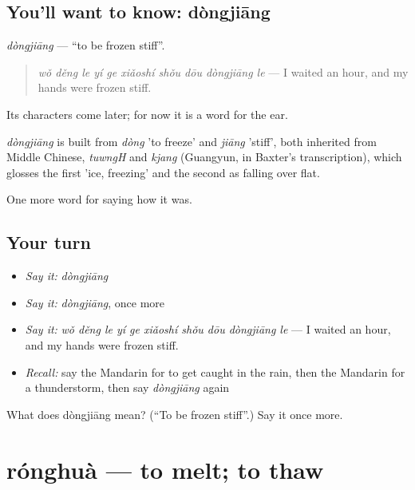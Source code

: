 \subsection*{You'll want to know: dòngjiāng}
\emph{dòngjiāng} — \textquotedblleft{}to be frozen stiff\textquotedblright{}.

\begin{quote}
\emph{wǒ děng le yí ge xiǎoshí shǒu dōu dòngjiāng le} — I waited an hour, and my hands were frozen stiff.
\end{quote}

Its characters come later; for now it is a word for the ear.

\begin{cousinweb}
\emph{dòngjiāng} is built from \emph{dòng} 'to freeze' and \emph{jiāng} 'stiff', both inherited from Middle Chinese, \emph{tuwngH} and \emph{kjang} (Guangyun, in Baxter's transcription), which glosses the first 'ice, freezing' and the second as falling over flat.
\end{cousinweb}

\begin{grammarlens}[title={What you've built}]
One more word for saying how it was.
\end{grammarlens}

\subsection*{Your turn}
\begin{itemize}
\raggedright
  \item \emph{Say it:} \emph{dòngjiāng}
  \item \emph{Say it:} \emph{dòngjiāng}, once more
  \item \emph{Say it:} \emph{wǒ děng le yí ge xiǎoshí shǒu dōu dòngjiāng le} — I waited an hour, and my hands were frozen stiff.
  \item \emph{Recall:} say the Mandarin for to get caught in the rain, then the Mandarin for a thunderstorm, then say \emph{dòngjiāng} again
\end{itemize}

\begin{tcolorbox}[breakable,colback=teal!4,colframe=teal!35!black,title={Before you move on}]
What does dòngjiāng mean? (\textquotedblleft{}To be frozen stiff\textquotedblright{}.) Say it once more.
\end{tcolorbox}
\section[rónghuà]{rónghuà — to melt; to thaw}

